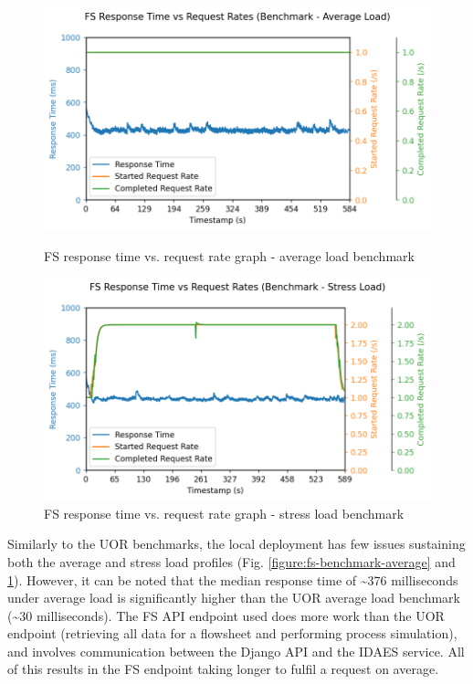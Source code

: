 \begin{figure}[h]
    \centering
    \begin{minipage}{.47\textwidth}
        \centering
        \includegraphics[width=\linewidth]{figures/fs-benchmark-average.png}
        \caption{FS response time vs. request rate graph - average load benchmark}
        \label{figure:fs-benchmark-average}
    \end{minipage}%
    \hspace{0.05\textwidth} %
    \begin{minipage}{.47\textwidth}
        \centering
        \includegraphics[width=\linewidth]{figures/fs-benchmark-stress.png}
        \caption{FS response time vs. request rate graph - stress load benchmark}
        \label{figure:fs-benchmark-stress}
    \end{minipage}
\end{figure}

\noindent Similarly to the UOR benchmarks, the local deployment has few issues sustaining both the average and stress load profiles (Fig. \ref{figure:fs-benchmark-average} and \ref{figure:fs-benchmark-stress}). However, it can be noted that the median response time of \textasciitilde376 milliseconds under average load is significantly higher than the UOR average load benchmark (\textasciitilde30 milliseconds). The FS API endpoint used does more work than the UOR endpoint (retrieving all data for a flowsheet and performing process simulation), and involves communication between the Django API and the IDAES service. All of this results in the FS endpoint taking longer to fulfil a request on average.

